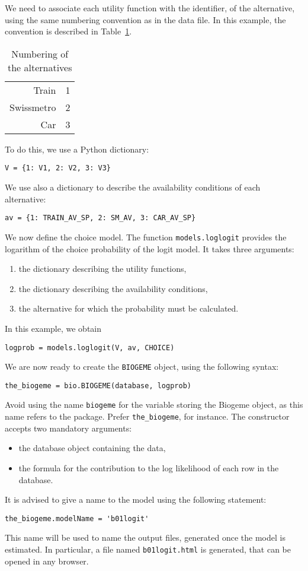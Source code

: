 \documentclass[12pt,a4paper]{article}
\begin{document}
We need to associate each utility function with the identifier, of the
alternative, using the same numbering convention as in the data file. In this
example, the convention is described in Table~\ref{tab:choice}.

\begin{table}[htb]
\begin{center}
\begin{tabular}{rl}
Train & 1 \\
Swissmetro & 2 \\
Car & 3
\end{tabular}
\end{center}
\caption{\label{tab:choice}Numbering of the alternatives}
\end{table}


To do
this, we use a Python dictionary:
\begin{lstlisting}[style=nonumbers]
V = {1: V1, 2: V2, 3: V3}
\end{lstlisting}
We use also a dictionary to describe the availability conditions of
each alternative:
\begin{lstlisting}[style=nonumbers]
av = {1: TRAIN_AV_SP, 2: SM_AV, 3: CAR_AV_SP}
\end{lstlisting}


We now define the choice model. The function \lstinline+models.loglogit+
provides the logarithm of the choice probability of the logit
model. It takes three arguments: 
\begin{enumerate}
\item the dictionary describing the utility functions,
\item the dictionary describing the availability conditions,
\item the alternative for which the probability must be calculated.
\end{enumerate}
In this example, we obtain
\begin{lstlisting}[style=nonumbers]
logprob = models.loglogit(V, av, CHOICE)
\end{lstlisting}

We are now ready to create the \lstinline+BIOGEME+ object, using the
following syntax:
\begin{lstlisting}
the_biogeme = bio.BIOGEME(database, logprob)
\end{lstlisting}
Avoid using the name \lstinline+biogeme+ for the variable storing the Biogeme object, as this name refers to the package. Prefer \lstinline+the_biogeme+, for instance.
The constructor accepts two mandatory arguments:
\begin{itemize}
\item the database object containing the data,
\item the formula for the contribution to the log likelihood of each
  row in the database. 
\end{itemize}
It is advised to give a name to the model using the following
statement:
\begin{lstlisting}
the_biogeme.modelName = 'b01logit'
\end{lstlisting}
This name will be used to name the output files, generated once the model is estimated. In particular, a file named \lstinline+b01logit.html+ is generated, that can be opened in any browser.
\end{document}
